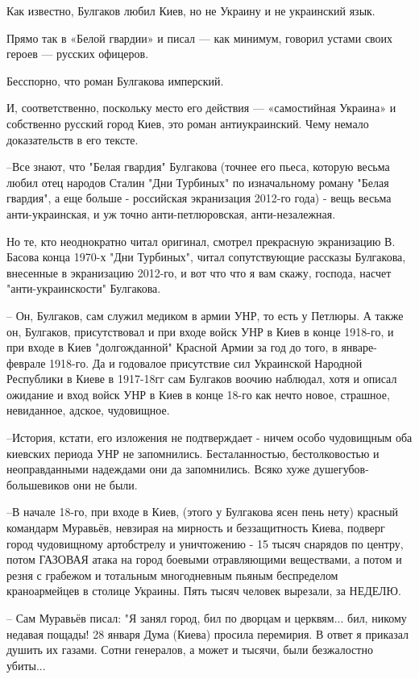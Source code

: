 \begin{itemize}

Как известно, Булгаков любил Киев, но не Украину и не украинский язык.

Прямо так в «Белой гвардии» и писал — как минимум, говорил устами своих героев
— русских офицеров.

Бесспорно, что роман Булгакова имперский.

И, соответственно, поскольку место его действия — «самостийная Украина» и
собственно русский город Киев, это роман антиукраинский. Чему немало
доказательств в его тексте.

–Все знают, что "Белая гвардия" Булгакова (точнее его пьеса, которую весьма
любил отец народов Сталин "Дни Турбиных" по изначальному роману "Белая
гвардия", а еще больше - российская экранизация 2012-го года) - вещь весьма
анти-украинская, и уж точно анти-петлюровская, анти-незалежная.

Но те, кто неоднократно читал оригинал, смотрел прекрасную экранизацию В.
Басова конца 1970-х "Дни Турбиных", читал сопутствующие рассказы Булгакова,
внесенные в экранизацию 2012-го, и вот что что я вам скажу, господа, насчет
"анти-украинскости" Булгакова.

– Он, Булгаков, сам служил медиком в армии УНР, то есть у Петлюры. А также он,
Булгаков, присутствовал и при входе войск УНР в Киев в конце 1918-го, и при
входе в Киев "долгожданной" Красной Армии за год до того, в январе-феврале
1918-го. Да и годовалое присутствие сил Украинской Народной Республики в Киеве
в 1917-18гг сам Булгаков воочию наблюдал, хотя и описал ожидание и вход войск
УНР в Киев в конце 18-го как нечто новое, страшное, невиданное, адское,
чудовищное.

–История, кстати, его изложения не подтверждает - ничем особо чудовищным оба
киевских периода УНР не запомнились. Бесталанностью, бестолковостью и
неоправданными надеждами они да запомнились. Всяко хуже душегубов-большевиков
они не были.

–В начале 18-го, при входе в Киев, (этого у Булгакова ясен пень нету) красный
командарм Муравьёв, невзирая на мирность и беззащитность Киева, подверг город
чудовищному артобстрелу и уничтожению - 15 тысяч снарядов по центру, потом
ГАЗОВАЯ атака на город боевыми отравляющими веществами, а потом и резня с
грабежом и тотальным многодневным пьяным беспределом краноармейцев в столице
Украины. Пять тысяч человек вырезали, за НЕДЕЛЮ.

– Сам Муравьёв писал: "Я занял город, бил по дворцам и церквям... бил, никому
недавая пощады! 28 января Дума (Киева) просила перемирия. В ответ я приказал
душить их газами. Сотни генералов, а может и тысячи, были безжалостно убиты...


\end{itemize}

